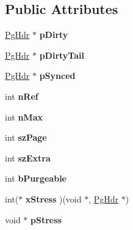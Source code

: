 \subsection*{Public Attributes}
\begin{DoxyCompactItemize}
\item 
\hypertarget{struct_p_cache_a1c692ce92c7d3fc7c6c1324d5658b252}{\hyperlink{struct_pg_hdr}{Pg\-Hdr} $\ast$ {\bfseries p\-Dirty}}\label{struct_p_cache_a1c692ce92c7d3fc7c6c1324d5658b252}

\item 
\hypertarget{struct_p_cache_a8eaca309bfb8fa49e7c5e77dd3398bb0}{\hyperlink{struct_pg_hdr}{Pg\-Hdr} $\ast$ {\bfseries p\-Dirty\-Tail}}\label{struct_p_cache_a8eaca309bfb8fa49e7c5e77dd3398bb0}

\item 
\hypertarget{struct_p_cache_a607eabd6768dd8df47d8fa353542b106}{\hyperlink{struct_pg_hdr}{Pg\-Hdr} $\ast$ {\bfseries p\-Synced}}\label{struct_p_cache_a607eabd6768dd8df47d8fa353542b106}

\item 
\hypertarget{struct_p_cache_a8270710a90112645a69cea03ab5a2d25}{int {\bfseries n\-Ref}}\label{struct_p_cache_a8270710a90112645a69cea03ab5a2d25}

\item 
\hypertarget{struct_p_cache_aa8797980e4f40eb9cc79afd41b0b279b}{int {\bfseries n\-Max}}\label{struct_p_cache_aa8797980e4f40eb9cc79afd41b0b279b}

\item 
\hypertarget{struct_p_cache_abb0bd0a3292780dcc07cb59bc577990d}{int {\bfseries sz\-Page}}\label{struct_p_cache_abb0bd0a3292780dcc07cb59bc577990d}

\item 
\hypertarget{struct_p_cache_abcb37fcd3ea098b98a196a3f69e3c135}{int {\bfseries sz\-Extra}}\label{struct_p_cache_abcb37fcd3ea098b98a196a3f69e3c135}

\item 
\hypertarget{struct_p_cache_a6dbb1820ecbfb378841ee81186ea5902}{int {\bfseries b\-Purgeable}}\label{struct_p_cache_a6dbb1820ecbfb378841ee81186ea5902}

\item 
\hypertarget{struct_p_cache_a8b177ebb03aaf4774b6137d48733eeb5}{int($\ast$ {\bfseries x\-Stress} )(void $\ast$, \hyperlink{struct_pg_hdr}{Pg\-Hdr} $\ast$)}\label{struct_p_cache_a8b177ebb03aaf4774b6137d48733eeb5}

\item 
\hypertarget{struct_p_cache_af04a2ea8a2c6d6b3eea7bb7051b8f447}{void $\ast$ {\bfseries p\-Stress}}\label{struct_p_cache_af04a2ea8a2c6d6b3eea7bb7051b8f447}


\end{DoxyCompactItemize}
